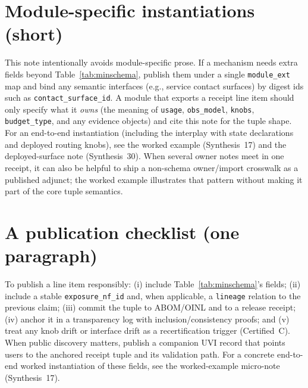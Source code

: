 \documentclass[11pt]{article}
\begin{document}
\section{Module-specific instantiations (short)}
This note intentionally avoids module-specific prose.
If a mechanism needs extra fields beyond Table~\ref{tab:minschema}, publish them under a single \texttt{module\_ext} map and bind any semantic interfaces (e.g., service contact surfaces) by digest ids such as \texttt{contact\_surface\_id}.
A module that exports a receipt line item should only specify what it \emph{owns} (the meaning of \texttt{usage}, \texttt{obs\_model}, \texttt{knobs}, \texttt{budget\_type}, and any evidence objects) and cite this note for the tuple shape.
For an end-to-end instantiation (including the interplay with state declarations and deployed routing knobs), see the worked example (Synthesis~17) and the deployed-surface note (Synthesis~30).\cite{series:workedexample,series:deployedsurfaces}
When several owner notes meet in one receipt, it can also be helpful to ship a non-schema owner/import crosswalk as a published adjunct; the worked example illustrates that pattern without making it part of the core tuple semantics.\cite{series:workedexample,series:mathcrosswalk}

\section{A publication checklist (one paragraph)}
To publish a line item responsibly:
(i) include Table~\ref{tab:minschema}'s fields;
(ii) include a stable \texttt{exposure\_nf\_id} and, when applicable, a \texttt{lineage} relation to the previous claim;
(iii) commit the tuple to ABOM/OINL and to a release receipt;\cite{series:abomoinl,series:releaseproperty}
(iv) anchor it in a transparency log with inclusion/consistency proofs;\cite{series:transparencyprimitives}
and (v) treat any knob drift or interface drift as a recertification trigger (Certified~C).\cite{series:recert}
When public discovery matters, publish a companion UVI record that points users to the anchored receipt tuple and its validation path.\cite{series:userminiface}
For a concrete end-to-end worked instantiation of these fields, see the worked-example micro-note (Synthesis~17).\cite{series:workedexample}
\end{document}
